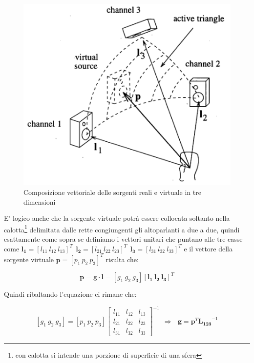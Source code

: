 \documentclass[12pt,a4paper]{report}
\begin{document}
\begin{figure}[htbp]
	\centering
	\includegraphics[scale=0.50]{figures/matrix3d.png}
	\caption {Composizione vettoriale delle sorgenti reali e virtuale in tre dimensioni} 
	\label{fig:triangolo}
	\end{figure}

E' logico anche che la sorgente virtuale potrà essere collocata soltanto nella calotta\footnote{con calotta si intende una porzione di superficie di una sfera} delimitata dalle rette congiungenti gli altoparlanti a due a due,	 quindi esattamente come sopra se definiamo i vettori unitari che puntano alle tre casse come $ \boldsymbol{l_{1}}= {\left[ l_{11} \ l_{12} \ l_{13} \right]}^T \ \ \boldsymbol{l_{2}}= {\left[ l_{21} \ l_{22} \ l_{23} \right]}^T \ \ \boldsymbol{l_{3}}= {\left[ l_{31} \ l_{32} \ l_{33} \right]}^T$ e il vettore della sorgente virtuale $\boldsymbol{p}= {\left[ p_{1} \ p_{2} \ p_{3} \right]}^T$ risulta che:

\begin{equation}
\boldsymbol{p} = \boldsymbol{g} \cdot \boldsymbol{l} = \left[ g_1 \ g_2 \ g_3 \right] \left[ \boldsymbol{l_{1}} \ \boldsymbol{l_{2}} \ \boldsymbol{l_{3}} \right]^T
\label{gggg}
\end{equation}

Quindi ribaltando l'equazione ci rimane che:

\begin{equation}
\left[g_1 \ g_2 \ g_3 \right] = \left[ p_1 \ p_2 \ p_3 \right]  {\left[\begin{matrix} 
l_{11} & l_{12} & l_{13}\\ l_{21} & l_{22} & l_{23} \\ l_{31} & l_{32} & l_{33}
\end{matrix} \right]}^{-1} \ \ \Rightarrow \ \ \ \boldsymbol{g}=\boldsymbol{p}^T {\boldsymbol{L_{123}}}^{-1}
\label{hhhh}
\end{equation}
\end{document}
